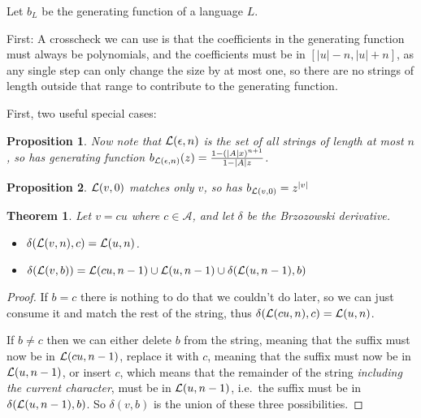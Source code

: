 \documentclass[a4paper]{book}
\newtheorem{proposition}{Proposition}
\newtheorem{theorem}{Theorem}
\begin{document}
Let \(b_L\) be the generating function of a language \(L\).

First: A crosscheck we can use is that the coefficients in the generating function must always be polynomials,
and the coefficients must be in \([|u| - n, |u| + n]\),
as any single step can only change the size by at most one,
so there are no strings of length outside that range to contribute to the generating function.

First,
two useful special cases:

\begin{proposition}
Now note that \(\mathcal{L} (\epsilon, n)\) is the set of all strings of length at most \(n\),
so has generating function \(b_{\mathcal{L} (\epsilon, n)}(z) = \frac{1 - {(|A|x)}^{n + 1}}{1 - |A| z}\).
\end{proposition}

\begin{proposition}
\(\mathcal{L} (v, 0)\) matches only \(v\),
so has \(b_{\mathcal{L} (v, 0)} = z^{|v|}\) 
\end{proposition}

\begin{theorem}
Let \(v = cu\) where \(c \in \mathcal{A}\),
and let \(\delta\) be the Brzozowski derivative.

\begin{itemize}
\item \(\delta(\mathcal{L} (v, n), c) = \mathcal{L} (u, n)\).
\item \(\delta(\mathcal{L} (v, b)) = \mathcal{L} (cu, n - 1) \cup \mathcal{L} (u, n - 1) \cup \delta(\mathcal{L} (u, n - 1), b)\)
\end{itemize}

\end{theorem}

\begin{proof}
If \(b = c\) there is nothing to do that we couldn't do later,
so we can just consume it and match the rest of the string,
thus \(\delta(\mathcal{L} (cu, n), c) = \mathcal{L} (u, n)\).

If \(b \neq c\) then we can either delete \(b\) from the string,
meaning that the suffix must now be in \(\mathcal{L} (cu, n - 1)\),
replace it with \(c\),
meaning that the suffix must now be in \(\mathcal{L} (u, n - 1)\),
or insert \(c\),
which means that the remainder of the string \emph{including the current character},
must be in \(\mathcal{L} (u, n - 1)\),
i.e.\ the suffix must be in \(\delta(\mathcal{L} (u, n - 1), b)\).
So \(\delta(v, b)\) is the union of these three possibilities.
\end{proof}
\end{document}
